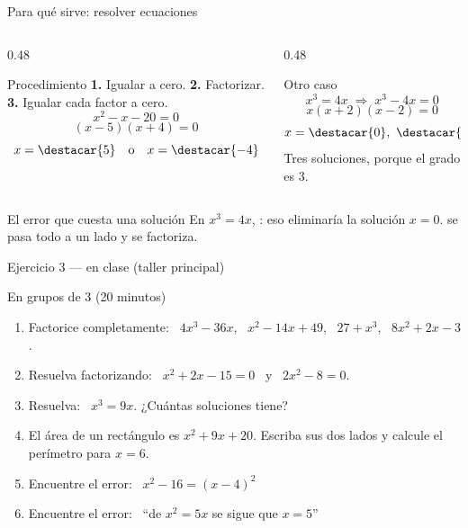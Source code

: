 \documentclass[aspectratio=169,10pt]{beamer}
\begin{document}
\begin{frame}{Para qué sirve: resolver ecuaciones}
  \scriptsize
  \begin{columns}[T,onlytextwidth]
    \begin{column}{0.48\textwidth}
      \begin{exampleblock}{Procedimiento}
        \tiny
        \textbf{1.} Igualar a cero. \quad
        \textbf{2.} Factorizar. \quad
        \textbf{3.} Igualar cada factor a cero.
        \[ x^{2}-x-20 = 0 \]
        \[ (x-5)(x+4) = 0 \]
        \[ x = \destacar{5} \quad\text{o}\quad x = \destacar{-4} \]
      \end{exampleblock}
    \end{column}
    \begin{column}{0.48\textwidth}
      \begin{exampleblock}{Otro caso}
        \tiny
        \[ x^{3} = 4x \;\Rightarrow\; x^{3}-4x = 0 \]
        \[ x(x+2)(x-2) = 0 \]
        \[ x = \destacar{0},\ \destacar{-2},\ \destacar{2} \]
        {\color{uniGris} Tres soluciones, porque el grado es 3.}
      \end{exampleblock}
    \end{column}
  \end{columns}

  \vspace{0.08cm}
  \begin{alertblock}{El error que cuesta una solución}
    \scriptsize
    En $x^{3}=4x$, : eso eliminaría la
    solución $x=0$.  se pasa todo a un lado y se factoriza.
  \end{alertblock}
\end{frame}

\begin{frame}{Ejercicio 3 — en clase (taller principal)}
  \begin{alertblock}{En grupos de 3 (20 minutos)}
    \tiny
    \begin{enumerate}\setlength{\itemsep}{0.05cm}
      \item Factorice completamente: \ $4x^{3}-36x$, \ $x^{2}-14x+49$, \
            $27+x^{3}$, \ $8x^{2}+2x-3$.
      \item Resuelva factorizando: \ $x^{2}+2x-15 = 0$ \ y \
            $2x^{2}-8 = 0$.
      \item Resuelva: \ $x^{3} = 9x$. ¿Cuántas soluciones tiene?
      \item El área de un rectángulo es $x^{2}+9x+20$. Escriba sus dos lados
            y calcule el perímetro para $x = 6$.
      \item Encuentre el error: \ $x^{2}-16 = (x-4)^{2}$
      \item Encuentre el error: \ ``de $x^{2}=5x$ se sigue que $x=5$''
    \end{enumerate}
  \end{alertblock}
\end{frame}
\end{document}
